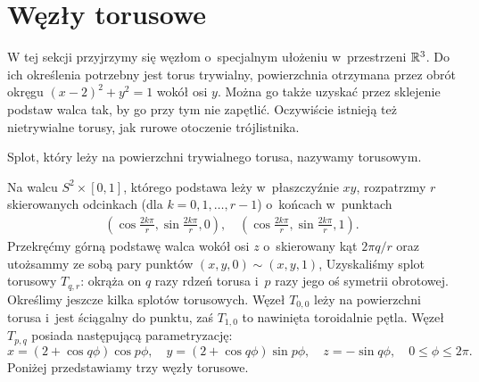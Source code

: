 \section{Węzły torusowe}

W tej sekcji przyjrzymy się węzłom o~specjalnym ułożeniu w~przestrzeni $\mathbb R^3$.
Do ich określenia potrzebny jest torus trywialny, powierzchnia otrzymana przez obrót okręgu $(x-2)^2 + y^2 = 1$ wokół osi $y$.
Można go także uzyskać przez sklejenie podstaw walca tak, by go przy tym nie zapętlić.
Oczywiście istnieją też nietrywialne torusy, jak rurowe otoczenie trójlistnika.

\begin{definition}
%
    Splot, który leży na powierzchni trywialnego torusa, nazywamy torusowym.
\end{definition}

Na walcu $S^2 \times [0,1]$, którego podstawa leży w~płaszczyźnie $xy$, rozpatrzmy $r$ skierowanych odcinkach (dla $k = 0, 1, \ldots, r - 1$) o~końcach w~punktach
\begin{align*}
    \left(\cos \frac{2k \pi}{r}, \sin \frac{2k\pi}{r}, 0 \right), \quad
    \left(\cos \frac{2k \pi}{r}, \sin \frac{2k\pi}{r}, 1 \right).
\end{align*}
Przekręćmy górną podstawę walca wokół osi $z$ o~skierowany kąt $2\pi q / r$ oraz utożsammy ze sobą pary punktów $(x, y, 0) \sim (x, y, 1)$,
Uzyskaliśmy splot torusowy $T_{q, r}$: okrąża on $q$ razy rdzeń torusa i~$p$ razy jego oś symetrii obrotowej.
Określimy jeszcze kilka splotów torusowych.
Węzeł $T_{0, 0}$ leży na powierzchni torusa i~jest ściągalny do punktu, zaś $T_{1, 0}$ to nawinięta toroidalnie pętla.
Węzeł $T_{p, q}$ posiada następującą parametryzację:
\[
    x = (2+\cos q \phi) \cos p \phi, \quad
    y = (2+\cos q \phi) \sin p \phi, \quad
    z = - \sin q \phi, \quad
    0 \le \phi \le 2\pi.
\]
Poniżej przedstawiamy trzy węzły torusowe.

